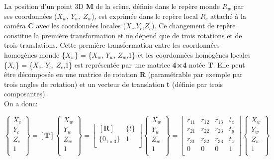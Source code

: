 
 La position d’un point 3D \textbf{M} de la scène, définie dans le repère monde $R_w$ par ses coordonnées ($X_w$, $Y_w$, $Z_w$), est exprimée dans le repère local $R_c$ attaché à la caméra \textbf{C} avec les coordonnées locales ($X_c$,$Y_c$,$Z_c$). Ce changement de repère constitue la première transformation et ne dépend que de trois rotations et de trois translations. Cette première transformation entre les coordonnées homogènes monde \{$X_w$\} = \{$X_w$, $Y_w$, $Z_w$,1\} et les coordonnées homogènes locales \{$X_c$\} = \{$X_c$, $Y_c$, $Z_c$,1\} est représentée par une matrice \textbf{4×4} notée \textbf{T}. Elle peut être décomposée en une matrice de rotation \textbf{R} (paramétrable par exemple par trois angles de rotation) et un vecteur de translation \textbf{t} (définie par trois composantes).\\
  On a donc:
 
 
 \begin{equation}
 \left\{
 \begin{array}{c}
 	X_c \\
 	Y_c\\
    Z_c \\
 	 1 \\
 \end{array}
 \right\}
 =
 \left[ \textbf{T} \right] 
 \left\{
 \begin{array}{c}
 	 X_w \\
 	 Y_w \\
 	 Z_w \\
 	 1 \\
 \end{array}
 \right\}
 =
 \left[  
 \begin{array}{cc}
\left[ \textbf{R} \right] & \{t\} \\
\{0_{1 \times 3}\} & 1 \\	 
 \end{array}
  \right] 
\left\{
\begin{array}{c}
	X_w \\
	Y_w \\
	Z_w \\
	1 \\
\end{array}
\right\}
=
 \left[ 
 \begin{array}{cccc}
 	r_{11} & r_{12} & r_{13} & t_x \\
 	r_{21} & r_{22} & r_{23} & t_y \\
 	r_{31} & r_{32} & r_{33} & t_z\\
 	0 & 0 & 0 & 1 \\
 \end{array}
  \right]
 \left\{
 \begin{array}{c}
 	X_w \\
 	Y_w \\
 	Z_w \\
 	1 \\
 \end{array}
 \right\}
  \end{equation}
 
